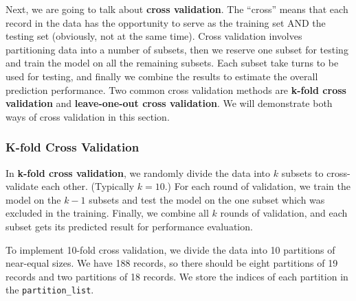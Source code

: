 \documentclass[
]{article}
\begin{document}
Next, we are going to talk about \textbf{cross validation}. The
``cross'' means that each record in the data has the opportunity to
serve as the training set AND the testing set (obviously, not at the
same time). Cross validation involves partitioning data into a number of
subsets, then we reserve one subset for testing and train the model on
all the remaining subsets. Each subset take turns to be used for
testing, and finally we combine the results to estimate the overall
prediction performance. Two common cross validation methods are
\textbf{k-fold cross validation} and \textbf{leave-one-out cross
validation}. We will demonstrate both ways of cross validation in this
section.

\hypertarget{k-fold}{%
\subsubsection{K-fold Cross Validation}\label{k-fold}}

In \textbf{k-fold cross validation}, we randomly divide the data into
\(k\) subsets to cross-validate each other. (Typically \(k=10\).) For
each round of validation, we train the model on the \(k-1\) subsets and
test the model on the one subset which was excluded in the training.
Finally, we combine all \(k\) rounds of validation, and each subset gets
its predicted result for performance evaluation.

To implement 10-fold cross validation, we divide the data into 10
partitions of near-equal sizes. We have 188 records, so there should be
eight partitions of 19 records and two partitions of 18 records. We
store the indices of each partition in the \texttt{partition\_list}.
\end{document}
